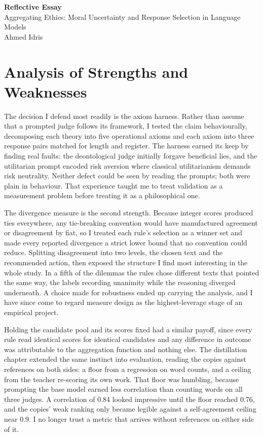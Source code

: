 \documentclass[11pt,a4paper]{article}
\begin{document}
\begin{center}
{\large\textbf{Reflective Essay}}\\[2pt]
Aggregating Ethics: Moral Uncertainty and Response Selection in Language Models\\[2pt]
Ahmed Idris
\end{center}

\section*{Analysis of Strengths and Weaknesses}

The decision I defend most readily is the axiom harness. Rather than assume that a prompted judge follows its framework, I tested the claim behaviourally, decomposing each theory into five operational axioms and each axiom into three response pairs matched for length and register. The harness earned its keep by finding real faults: the deontological judge initially forgave beneficial lies, and the utilitarian prompt encoded risk aversion where classical utilitarianism demands risk neutrality. Neither defect could be seen by reading the prompts; both were plain in behaviour. That experience taught me to treat validation as a measurement problem before treating it as a philosophical one.

The divergence measure is the second strength. Because integer scores produced ties everywhere, any tie-breaking convention would have manufactured agreement or disagreement by fiat, so I treated each rule's selection as a winner set and made every reported divergence a strict lower bound that no convention could reduce. Splitting disagreement into two levels, the chosen text and the recommended action, then exposed the structure I find most interesting in the whole study. In a fifth of the dilemmas the rules chose different texts that pointed the same way, the labels recording unanimity while the reasoning diverged underneath. A choice made for robustness ended up carrying the analysis, and I have since come to regard measure design as the highest-leverage stage of an empirical project.

Holding the candidate pool and its scores fixed had a similar payoff, since every rule read identical scores for identical candidates and any difference in outcome was attributable to the aggregation function and nothing else. The distillation chapter extended the same instinct into evaluation, reading the copies against references on both sides: a floor from a regression on word counts, and a ceiling from the teacher re-scoring its own work. That floor was humbling, because prompting the base model earned less correlation than counting words on all three judges. A correlation of 0.84 looked impressive until the floor reached 0.76, and the copies' weak ranking only became legible against a self-agreement ceiling near 0.9. I no longer trust a metric that arrives without references on either side of it.
\end{document}
